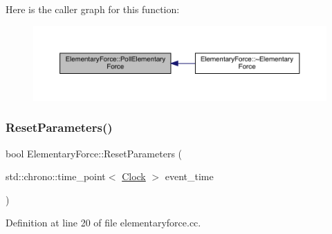 Here is the caller graph for this function\+:
\nopagebreak
\begin{figure}[H]
\begin{center}
\leavevmode
\includegraphics[width=350pt]{class_elementary_force_aa5ab479744dbf3e8578f8d2974299ff7_icgraph}
\end{center}
\end{figure}
\mbox{\label{class_elementary_force_a1dedcd23a538b87f71ecd43cb36a6db5}} 
\subsubsection{\texorpdfstring{Reset\+Parameters()}{ResetParameters()}}
{\footnotesize\ttfamily bool Elementary\+Force\+::\+Reset\+Parameters (\begin{DoxyParamCaption}\item[{std\+::chrono\+::time\+\_\+point$<$ \hyperlink{universe_8h_a0ef8d951d1ca5ab3cfaf7ab4c7a6fd80}{Clock} $>$}]{event\+\_\+time }\end{DoxyParamCaption})}



Definition at line 20 of file elementaryforce.\+cc.

